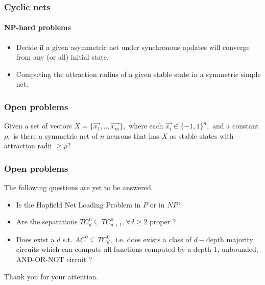 \documentclass{beamer}
\begin{document}
\begin{frame}
\frametitle{Cyclic nets}
\framesubtitle{NP-hard problems}
\justify
\begin{itemize}
	\item Decide if a given asymmetric net under synchronous updates will converge from any (or all) initial state.
	\item Computing the attraction radius of a given stable state in a symmetric simple net.
\end{itemize}
\end{frame}

\begin{frame}
\frametitle{Open problems}
\begin{definition}
	\justify
	Given a set of vectors $X=\{\vec{x_1}, .., \vec{x_m}\},$ where each $\vec{x_i} \in \{-1,1\}^n,$ and a constant $\rho,$ is there a symmetric net of $n$ neurons that has $X$ as stable states with attraction radii $\geq \rho?$
\end{definition}
\end{frame}

\begin{frame}
	\frametitle{Open problems}
The following questions are yet to be answered.
\begin{itemize}
	\item Is the Hopfield Net Loading Problem in $P$ or in $NP$?
	\item Are the separations $TC_d^0 \subseteq TC_{d+1}^0, \forall d\geq2$ proper ? 
	\item Does exist a $d$ s.t. $AC^0 \subseteq TC_d^0, $ i.e. does exists a class of $d-$depth majority circuits which can compute all functions computed by a depth 1, unbounded, AND-OR-NOT circuit ?
\end{itemize}
\end{frame}
\begin{frame}
\begin{center}
	Thank you for your attention.
\end{center}
\end{frame}
\end{document}
